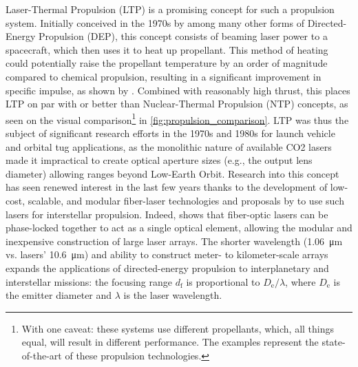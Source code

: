     Laser-Thermal Propulsion (LTP) is a promising concept for such a propulsion system. Initially conceived in the 1970s by \textcite{kantrowitzRelevanceSpace1971} among many other forms of Directed-Energy Propulsion (DEP), this concept consists of beaming laser power to a spacecraft, which then uses it to heat up propellant. This method of heating could potentially raise the propellant temperature by an order of magnitude compared to chemical propulsion, resulting in a significant improvement in specific impulse, as shown by \textcite{noredApplicationHighPower1976}. Combined with reasonably high thrust, this places LTP on par with or better than Nuclear-Thermal Propulsion (NTP) concepts, as seen on the visual comparison\footnote{With one caveat: these systems use different propellants, which, all things equal, will result in different performance. The examples represent the state-of-the-art of these propulsion technologies.} in \autoref{fig:propulsion_comparison}. LTP was thus the subject of significant research efforts in the 1970s and 1980s for launch vehicle and orbital tug applications, as the monolithic nature of available CO2 lasers made it impractical to create optical aperture sizes (e.g., the output lens diameter) allowing ranges beyond Low-Earth Orbit. Research into this concept has seen renewed interest in the last few years thanks to the development of low-cost, scalable, and modular fiber-laser technologies and proposals by \textcite{lubinRoadmapInterstellarFlight2016a} to use such lasers for interstellar propulsion. Indeed, \citeauthor{lubinRoadmapInterstellarFlight2016a} shows that fiber-optic lasers can be phase-locked together to act as a single optical element, allowing the modular and inexpensive construction of large laser arrays. The shorter wavelength (\qty{1.06}{\um} vs.  lasers' \qty{10.6}{\um}) and ability to construct meter- to kilometer-scale arrays expands the applications of directed-energy propulsion to interplanetary and interstellar missions: the focusing range $d_\mathrm{f}$ is proportional to $D_\mathrm{e}/\lambda$, where $D_\mathrm{e}$ is the emitter diameter and $\lambda$ is the laser wavelength.

